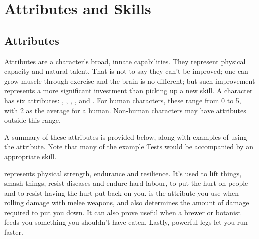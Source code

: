 \chapter{Attributes and Skills}

\section{Attributes}

Attributes are a character's broad, innate capabilities.
They represent physical capacity and natural talent.
That is not to say they can't be improved; one can grow muscle through exercise and the brain is no different; but such improvement represents a more significant investment than picking up a new skill.
A character has six attributes: , , , ,  and .
For human characters, these range from 0 to 5, with 2 as the average for a human.
Non-human characters may have attributes outside this range.

A summary of these attributes is provided below, along with examples of using the attribute.
Note that many of the example Tests would be accompanied by an appropriate skill.


 represents physical strength, endurance and resilience.
It's used to lift things, smash things, resist diseases and endure hard labour, to put the hurt on people and to resist having the hurt put back on you.
 is the attribute you use when rolling damage with melee weapons, and also determines the amount of damage required to put you down.
It can also prove useful when a brewer or botanist feeds you something you shouldn't have eaten.
Lastly, powerful legs let you run faster.

%

